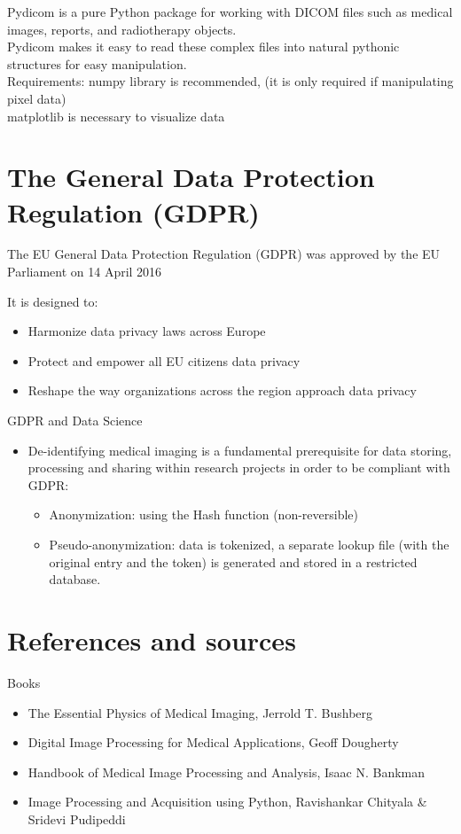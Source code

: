 Pydicom is a pure Python package for working with DICOM files such as medical images, reports, and radiotherapy objects.\\
Pydicom makes it easy to read these complex files into natural pythonic structures for easy manipulation.\\

Requirements: numpy library is recommended, (it is only required if manipulating pixel data)\\
matplotlib is necessary to visualize data


\section{The General Data Protection Regulation (GDPR)}

The EU General Data Protection Regulation (GDPR) was approved by the EU Parliament on 14 April 2016

It is designed to:
\begin{itemize}
	\item Harmonize data privacy laws across Europe
	\item Protect and empower all EU citizens data privacy
	\item Reshape the way organizations across the region approach data privacy
\end{itemize}

GDPR and Data Science
\begin{itemize}
	\item De-identifying medical imaging is a fundamental prerequisite for data storing, processing and sharing within research projects in order to be compliant with GDPR:
	\begin{itemize}
		\item Anonymization: using the Hash function (non-reversible)
		\item Pseudo-anonymization: data is tokenized, a separate lookup file (with the original entry and
		the token) is generated and stored in a restricted database.
	\end{itemize}
\end{itemize}

\section{References and sources}
Books
\begin{itemize}
	\item The Essential Physics of Medical Imaging, Jerrold T. Bushberg
	\item Digital Image Processing for Medical Applications, Geoff Dougherty
	\item Handbook of Medical Image Processing and Analysis, Isaac N. Bankman
	\item Image Processing and Acquisition using Python, Ravishankar Chityala \& Sridevi Pudipeddi
\end{itemize}

